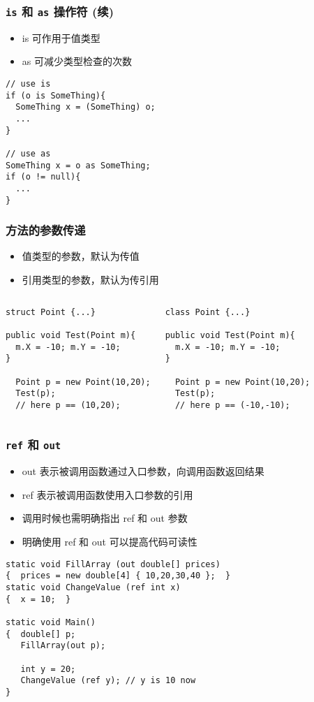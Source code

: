 \begin{frame}[fragile]
\frametitle{\texttt{is} 和 \texttt{as} 操作符 (续)}
\begin{itemize}
\item is 可作用于值类型
\item as 可减少类型检查的次数
\end{itemize}
\begin{lstlisting}
// use is
if (o is SomeThing){
  SomeThing x = (SomeThing) o;
  ...
}

// use as
SomeThing x = o as SomeThing;
if (o != null){
  ...
}

\end{lstlisting}
\end{frame}

\begin{frame}[fragile]
\frametitle{方法的参数传递}
\begin{itemize}
\item 值类型的参数，默认为{\redwarn 传值}
\item 引用类型的参数，默认为{\redwarn 传引用}
\end{itemize}
\begin{columns}
\begin{lstlisting}
struct Point {...}

public void Test(Point m){
  m.X = -10; m.Y = -10;
}

  Point p = new Point(10,20);
  Test(p);
  // here p == (10,20);
\end{lstlisting}
\begin{lstlisting}
class Point {...}

public void Test(Point m){
  m.X = -10; m.Y = -10;
}

  Point p = new Point(10,20);
  Test(p);
  // here p == (-10,-10);
\end{lstlisting}
\end{columns}
\end{frame}

\begin{frame}[fragile]
\frametitle{\texttt{ref} 和 \texttt{out}}
\begin{itemize}
\item out 表示被调用函数通过入口参数，向调用函数返回结果
\item ref 表示被调用函数使用入口参数的引用
\item 调用时候也需明确指出 ref 和 out 参数
\item 明确使用 ref 和 out 可以提高代码可读性
\end{itemize}
\pause
\begin{lstlisting}
static void FillArray (out double[] prices)
{  prices = new double[4] { 10,20,30,40 };  }
static void ChangeValue (ref int x)
{  x = 10;  }

static void Main()
{  double[] p;
   FillArray(out p);

   int y = 20;
   ChangeValue (ref y); // y is 10 now
}
\end{lstlisting}
\end{frame}


